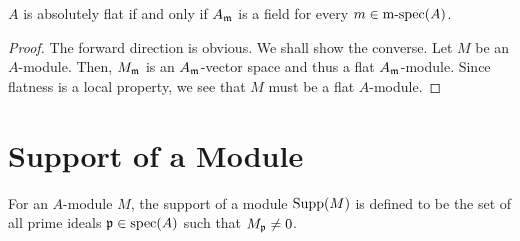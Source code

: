 \hrulefill 

\begin{theorem}
    $A$ is absolutely flat if and only if $A_\mathfrak m$ is a field for every $m\in\operatorname{m-spec}(A)$.
\end{theorem}
\begin{proof}
    The forward direction is obvious. We shall show the converse. Let $M$ be an $A$-module. Then, $M_\mathfrak m$ is an $A_\mathfrak m$-vector space and thus a flat $A_\mathfrak m$-module. Since flatness is a local property, we see that $M$ must be a flat $A$-module.
\end{proof}

\section{Support of a Module}

\begin{definition}
    For an $A$-module $M$, the support of a module $\operatorname{Supp}(M)$ is defined to be the set of all prime ideals $\mathfrak p\in\operatorname{spec}(A)$ such that $M_\mathfrak p\ne 0$.
\end{definition}


